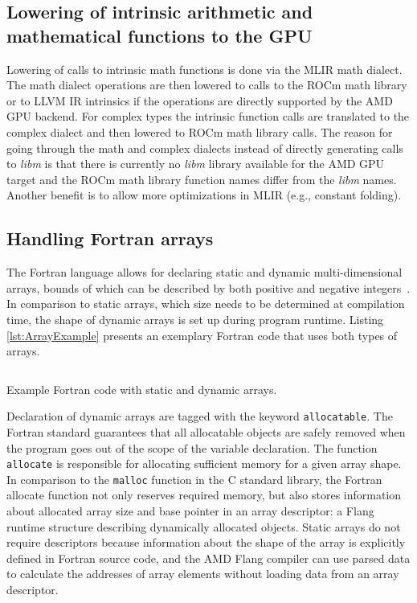 \documentclass[acmtog,natbib=false]{acmart}
\newcommand{\code}[1]{\texttt{#1}\xspace}
\newcommand{\trademark}[0]{\texttrademark\xspace}
\begin{document}
\subsection{Lowering of intrinsic arithmetic and mathematical functions to the GPU}
\label{sec:FortranIntrinsics}
Lowering of calls to intrinsic math functions is done via the \ac{MLIR} math dialect.
The math dialect operations are then lowered to calls to the ROCm\trademark math library or to LLVM \ac{IR} intrinsics if the operations are directly supported by the AMD GPU backend.
For complex types the intrinsic function calls are translated to the complex dialect and then lowered to ROCm\trademark math library calls.
The reason for going through the math and complex dialects instead of directly generating calls to \textit{libm} is that there is currently no \textit{libm} library available for the AMD GPU target and the ROCm\trademark math library function names differ from the \textit{libm} names. Another benefit is to allow more optimizations in \ac{MLIR} (e.g., constant folding).

\subsection{Handling Fortran arrays}
The Fortran language allows for declaring static and dynamic multi-dimensional arrays, bounds of which can be described by both positive and negative integers~\cite{F2023}.
In comparison to static arrays, which size needs to be determined at compilation time, the shape of dynamic arrays is set up during program runtime.
Listing \ref{lst:ArrayExample} presents an exemplary Fortran code that uses both types of arrays.

\begin{listing}[t]
\inputminted{Fortran}{code/arrays.f90}
\caption{Example Fortran code with static and dynamic arrays.}
\label{lst:ArrayExample}
\end{listing}

Declaration of dynamic arrays are tagged with the keyword \code{allocatable}.
The Fortran standard guarantees that all allocatable objects are safely removed when the program goes out of the scope of the variable declaration.
The function \code{allocate} is responsible for allocating sufficient memory for a given array shape.
In comparison to the \code{malloc} function in the C standard library, the Fortran allocate function not only reserves required memory, but also stores information about allocated array size and base pointer in an array descriptor: a Flang runtime structure describing dynamically allocated objects.
Static arrays do not require descriptors because information about the shape of the array is explicitly defined in Fortran source code, and the AMD Flang compiler can use parsed data to calculate the addresses of array elements without loading data from an array descriptor.
\end{document}
